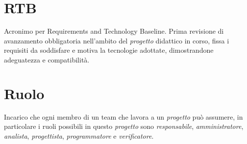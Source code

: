 \section{RTB}\label{sec:Requirements and Technology Baseline}
Acronimo per Requirements and Technology Baseline. Prima revisione di avanzamento obbligatoria nell'ambito del \emph{progetto} didattico in corso, fissa i requisiti da soddisfare e motiva la tecnologie adottate, dimostrandone adeguatezza e compatibilità.
\section{Ruolo}\label{sec:Ruoli}
Incarico che ogni membro di un team che lavora a un \emph{progetto} può assumere, in particolare i ruoli possibili in questo \emph{progetto} sono \emph{responsabile}, \emph{amministratore}, \emph{analista}, \emph{progettista}, \emph{programmatore} e \emph{verificatore}.

